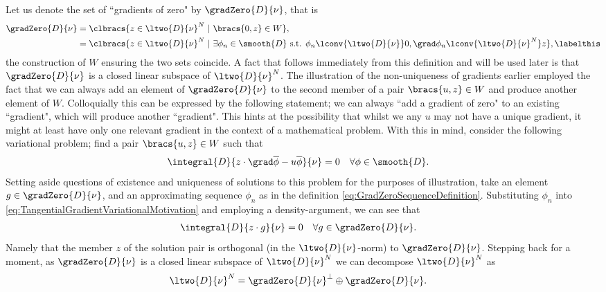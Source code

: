 Let us denote the set of ``gradients of zero" by $\gradZero{D}{\nu}$, that is
\begin{align*}
	\gradZero{D}{\nu} &= \clbracs{z\in\ltwo{D}{\nu}^N \ \vert \ \bracs{0,z}\in W}, \\
	&= \clbracs{z\in\ltwo{D}{\nu}^N \ \vert \ \exists\phi_n\in\smooth{D} \text{ s.t. } \phi_n\lconv{\ltwo{D}{\nu}}0, \grad\phi_n\lconv{\ltwo{D}{\nu}^N}z}, \labelthis\label{eq:GradZeroSequenceDefinition}
\end{align*}
the construction of $W$ ensuring the two sets coincide.
A fact that follows immediately from this definition and will be used later is that $\gradZero{D}{\nu}$ is a closed linear subspace of $\ltwo{D}{\nu}^N$.
The illustration of the non-uniqueness of gradients earlier employed the fact that we can always add an element of $\gradZero{D}{\nu}$ to the second member of a pair $\bracs{u,z}\in W$ and produce another element of $W$.
Colloquially this can be expressed by the following statement; we can always ``add a gradient of zero" to an existing ``gradient", which will produce another ``gradient".
This hints at the possibility that whilst we any $u$ may not have a unique gradient, it might at least have only one relevant gradient in the context of a mathematical problem.
With this in mind, consider the following variational problem; find a pair $\bracs{u,z}\in W$ such that
\begin{align} \label{eq:TangentialGradientVariationalMotivation}
	\integral{D}{z \cdot \grad\overline{\phi} - u\overline{\phi}}{\nu} &= 0 \quad \forall\phi\in\smooth{D}.
\end{align}
Setting aside questions of existence and uniqueness of solutions to this problem for the purposes of illustration, take an element $g\in\gradZero{D}{\nu}$, and an approximating sequence $\phi_n$ as in the definition \eqref{eq:GradZeroSequenceDefinition}.
Substituting $\phi_n$ into \eqref{eq:TangentialGradientVariationalMotivation} and employing a density-argument, we can see that
\begin{align*}
	\integral{D}{z \cdot g}{\nu} &= 0 \quad \forall g\in\gradZero{D}{\nu}.
\end{align*}
Namely that the member $z$ of the solution pair is orthogonal (in the $\ltwo{D}{\nu}$-norm) to $\gradZero{D}{\nu}$.
Stepping back for a moment, as $\gradZero{D}{\nu}$ is a closed linear subspace of $\ltwo{D}{\nu}^N$ we can decompose $\ltwo{D}{\nu}^N$ as
\begin{align*}
	\ltwo{D}{\nu}^N &= \gradZero{D}{\nu}^{\perp} \oplus \gradZero{D}{\nu}.
\end{align*}
